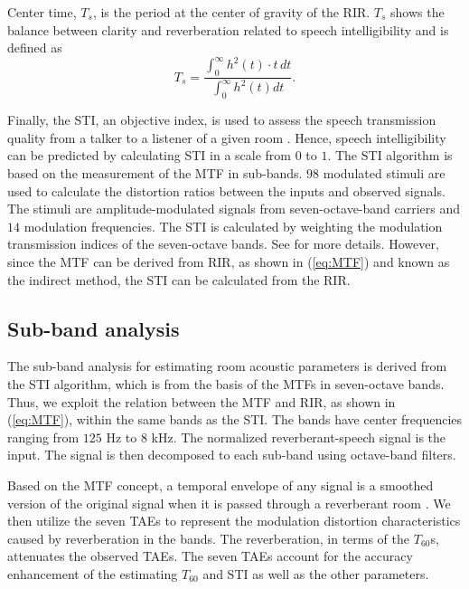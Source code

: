 \documentclass[conference]{IEEEtran}
\begin{document}
	Center time, $T_s$, is the period at the center of gravity of the RIR. $T_s$ shows the balance between clarity and reverberation related to speech intelligibility and is defined as
	\begin{equation}
		T_s\!=\!\frac{\displaystyle\int_{0}^{\infty} { h^2(t)}\cdot t\, dt}{\displaystyle\int_{0}^{\infty} {h^2(t)}dt}.
		\label{eq:Centre time}
	\end{equation}
	
	Finally, the STI, an objective index, is used to assess the speech transmission quality from a talker to a listener of a given room \cite{IEC60268_STI,Houtgast_Steeneken_MTF}. Hence, speech intelligibility can be predicted by calculating STI in a scale from $0$ to $1$. The STI algorithm is based on the measurement of the MTF in sub-bands. $98$ modulated stimuli are used to calculate the distortion ratios between the inputs and observed signals. The stimuli are amplitude-modulated signals from seven-octave-band carriers and $14$ modulation frequencies. The STI is calculated by weighting the modulation transmission indices of the seven-octave bands. See \cite{IEC60268_STI} for more details. However, since the MTF can be derived from RIR, as shown in (\ref{eq:MTF}) and known as the indirect method, the STI can be calculated from the RIR.  
	
	\subsection{Sub-band analysis}
	The sub-band analysis for estimating room acoustic parameters is derived from the STI algorithm, which is from the basis of the MTFs in seven-octave bands. Thus, we exploit the relation between the MTF and RIR, as shown in (\ref{eq:MTF}), within the same bands as the STI. The bands have center frequencies ranging from $125$ Hz to $8$ kHz. The normalized reverberant-speech signal is the input. The signal is then decomposed to each sub-band using octave-band filters.
	
	Based on the MTF concept, a temporal envelope of any signal is a smoothed version of the original signal when it is passed through a reverberant room \cite{Houtgast_Steeneken_MTF}. We then utilize the seven TAEs to represent the modulation distortion characteristics caused by reverberation in the bands. The reverberation, in terms of the $T_{60}$s, attenuates the observed TAEs. The seven TAEs account for the accuracy enhancement of the estimating $T_{60}$ and STI as well as the other parameters. 
	
\end{document}
